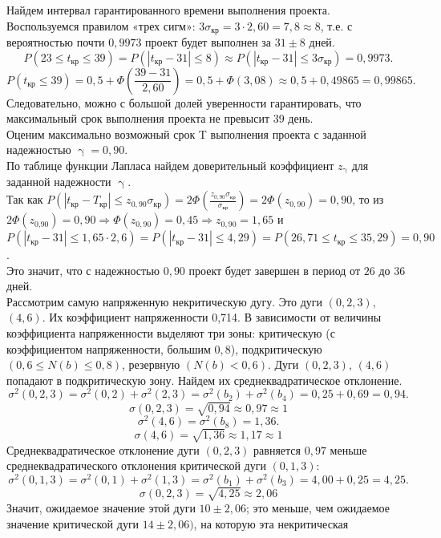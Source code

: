 \documentclass[a4paper, 12pt]{report}
\renewcommand{\leq}{\leqslant}
\renewcommand{\gamma}{\upgamma}
\begin{document}
	Найдем интервал гарантированного времени выполнения проекта.\\
	Воспользуемся правилом «трех сигм»: $3\sigma_{кр}=3\cdot 2,60=7,8\approx 8$, т.е. с вероятностью почти $0,9973$ проект будет выполнен за $31\pm 8$ дней.\\
	$$P(23\leq t_\text{кр}\leq 39)=P(|t_\text{кр}-31|\leq 8)\approx P(|t_\text{кр}-31|\leq 3\sigma_\text{кр})=0,9973.$$
	$$P(t_\text{кр}\leq 39)=0,5+\Phi\left(\frac{39-31}{2,60}\right)=0,5+\Phi(3,08)\approx 0,5+0,49865=0,99865.$$
	Следовательно, можно с большой долей уверенности гарантировать, что максимальный срок выполнения проекта не превысит 39
	день.\\
	Оценим максимально возможный срок T выполнения проекта с заданной надежностью $\gamma = 0,90$.\\
	По таблице функции Лапласа найдем доверительный коэффициент $z_\gamma$ для заданной надежности $\gamma$.\\
	Так как $P(|t_\text{кр}-T_\text{кр}|\leq z_{0,90}\sigma_\text{кр})=2\Phi\left(\frac{z_{0,90}\sigma_\text{кр}}{\sigma_\text{кр}}\right)=2\Phi(z_{0,90})=0,90$, то из $2\Phi(z_\text{0,90})=0,90\Longrightarrow \Phi(z_{0,90})=0,45\Longrightarrow z_{0,90}=1,65$ и $P(|t_\text{кр}-31|\leq 1,65\cdot 2,6)=P(|t_\text{кр}-31|\leq 4,29)=P(26,71\leq t_\text{кр}\leq 35,29)=0,90$.\\
	Это значит, что с надежностью $0,90$ проект будет завершен в период от $26$ до $36$ дней.\\ 
	Рассмотрим самую напряженную некритическую дугу. Это дуги $(0,2,3)$, $(4,6)$. Их коэффициент напряженности 0,714. В зависимости от
	величины коэффициента напряженности выделяют три зоны: критическую (с коэффициентом напряженности, большим $0,8$), подкритическую
	$(0,6 \leq N(b) \leq 0,8)$, резервную $(N(b) < 0,6)$. Дуги $(0,2,3)$, $(4,6)$ попадают в подкритическую зону. Найдем их среднеквадратическое отклонение.
	$$\sigma^2(0,2,3)=\sigma^2(0,2)+\sigma^2(2,3)=\sigma^2(b_2)+\sigma^2(b_4)=0,25+0,69=0,94.$$
	$$\sigma(0,2,3)=\sqrt{0,94}\approx 0,97\approx 1$$
	$$\sigma^2(4,6)=\sigma^2(b_8)=1,36.$$
	$$\sigma(4,6)=\sqrt{1,36}\approx 1,17\approx 1$$
	Среднеквадратическое отклонение дуги $(0,2,3)$ равняется $0,97$ меньше
	среднеквадратического отклонения критической дуги $(0,1,3)$:
	$$\sigma^2(0,1,3)=\sigma^2(0,1)+\sigma^2(1,3)=\sigma^2(b_1)+\sigma^2(b_3)=4,00+0,25=4,25.$$
	$$\sigma(0,2,3)=\sqrt{4,25}\approx 2,06$$
	Значит,
	ожидаемое значение этой дуги $10 \pm 2,06$; это меньше, чем ожидаемое
	значение критической дуги $14 \pm 2,06)$, на которую эта некритическая
\end{document}
